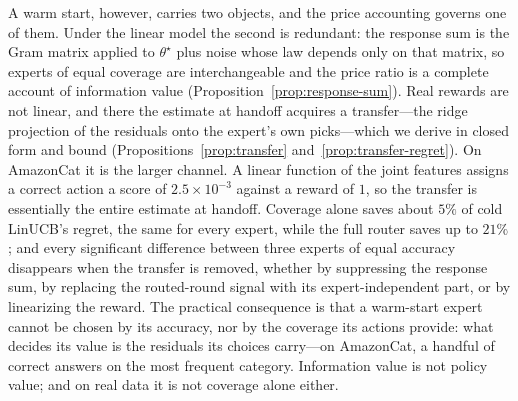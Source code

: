 \documentclass{article}
\theoremstyle{definition}
\theoremstyle{remark}
\theoremstyle{remark}
\begin{document}
A warm start, however, carries two objects, and the price accounting governs
one of them. Under the linear model the second is redundant: the response sum
is the Gram matrix applied to $\theta^\star$ plus noise whose law depends only
on that matrix, so experts of equal coverage are interchangeable and the price
ratio is a complete account of information value
(Proposition~\ref{prop:response-sum}). Real rewards are not linear, and there
the estimate at handoff acquires a transfer---the ridge projection of the
residuals onto the expert's own picks---which we derive in closed form and
bound (Propositions~\ref{prop:transfer} and~\ref{prop:transfer-regret}). On
AmazonCat it is the larger channel. A linear function of the joint features
assigns a correct action a score of $2.5\times10^{-3}$ against a reward of $1$,
so the transfer is essentially the entire estimate at handoff. Coverage alone
saves about $5\%$ of cold LinUCB's regret, the same for every expert, while
the full router saves up to $21\%$; and every significant difference between
three experts of equal accuracy disappears when the transfer is removed,
whether by suppressing the response sum, by replacing the routed-round signal
with its expert-independent part, or by linearizing the reward. The practical
consequence is that a warm-start expert cannot be chosen by its accuracy, nor
by the coverage its actions provide: what decides its value is the residuals
its choices carry---on AmazonCat, a handful of correct answers on the most
frequent category. Information value is not policy value; and on real data it
is not coverage alone either.
\end{document}
